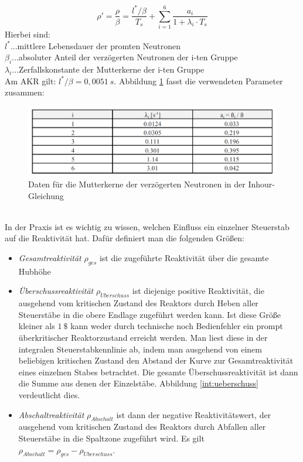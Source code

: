 	\begin{equation}\label{int:inhour}
		\rho\prime = \frac{\rho}{\beta} = \frac{l^*/\beta }{T_s}+ \sum_{i=1}^{6} \frac{a_i}{1 + \lambda_i\cdot T_s}
	\end{equation}
	Hierbei sind:\\
	$l^*$...mittlere Lebensdauer der promten Neutronen\\
	$\beta_i$...absoluter Anteil der verzögerten Neutronen der i-ten Gruppe\\
	$\lambda_i$...Zerfallskonstante der Mutterkerne der i-ten Gruppe\\
	Am AKR gilt: $l^* / \beta = 0,0051\ \unit{s}$. Abbildung \ref{int:datenInhour} fasst die verwendeten Parameter zusammen:
		\begin{figure}[ht]
					\centering
					\captionsetup{justification=centering}
					\includegraphics[scale=0.3]{pic/daten_inhour}
					\caption{Daten für die Mutterkerne der verzögerten Neutronen in der Inhour-Gleichung\cite{stab}}
					\label{int:datenInhour}
		\end{figure}
	\ \\
	In der Praxis ist es wichtig zu wissen, welchen Einfluss ein einzelner Steuerstab auf die Reaktivität hat. Dafür definiert man die folgenden Größen:
		\begin{itemize}
			\item \textit{Gesamtreaktivität} $\rho_{ges}$ ist die zugeführte Reaktivität über die gesamte Hubhöhe
			\item \textit{Überschussreaktivität} $\rho_{\ddot{U}berschuss}$ ist diejenige positive Reaktivität, die ausgehend vom kritischen Zustand des Reaktors durch Heben aller Steuerstäbe in die obere Endlage zugeführt werden kann. Ist diese Größe kleiner als $1\ \unit{\$}$ kann weder durch technische noch Bedienfehler ein prompt überkritischer Reaktorzustand erreicht werden. Man liest diese in der integralen Steuerstabkennlinie ab, indem man ausgehend von einem beliebigen kritischen Zustand den Abstand der Kurve zur Gesamtreaktivität eines einzelnen Stabes betrachtet. Die gesamte Überschussreaktivität ist dann die Summe aus denen der Einzelstäbe. Abbildung \ref{int:ueberschuss} verdeutlicht dies.
			\item \textit{Abschaltreaktivität} $\rho_{Abschalt}$ ist dann der negative Reaktivitätswert, der ausgehend vom kritischen Zustand des Reaktors durch Abfallen aller Steuerstäbe in die Spaltzone zugeführt wird. Es gilt $\rho_{Abschalt} = \rho_{ges} - \rho_{\ddot{U}berschuss}$. 
		\end{itemize}
